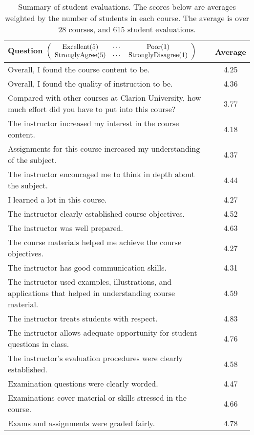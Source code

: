 \documentclass[12pt]{article}
\begin{document}
\begin{center}
\begin{table}[H]
\caption{Summary of student evaluations.  The scores below are averages weighted by the number of students in each course. The average is over 28 courses, and 615 student evaluations.}
\begin{tabular}{p{4.5in}c} \hline \hline
Question \scriptsize $\left( \begin{array}{ccc}  {\rm Excellent}(5) & \cdots & {\rm Poor}(1) \\ {\rm Strongly Agree}(5) & \cdots & {\rm Strongly Disagree}(1) \end{array} \right)$ & Average \\ \hline \hline
Overall, I found the course content to be. & 4.25 \\ \hline
Overall, I found the quality of instruction to be. & 4.36 \\ \hline
Compared with other courses at Clarion University, how much effort did you have to put into this course? & 3.77 \\ \hline
The instructor increased my interest in the course content. & 4.18 \\ \hline
Assignments for this course increased my understanding of the subject.  & 4.37 \\ \hline
The instructor encouraged me to think in depth about the subject. & 4.44 \\ \hline
I learned a lot in this course. & 4.27 \\ \hline
The instructor clearly established course objectives. & 4.52 \\ \hline
The instructor was well prepared. & 4.63 \\ \hline
The course materials helped me achieve the course objectives. & 4.27 \\ \hline
The instructor has good communication skills. & 4.31 \\ \hline
The instructor used examples, illustrations, and applications that helped in understanding course material. & 4.59 \\ \hline
The instructor treats students with respect. & 4.83 \\ \hline
The instructor allows adequate opportunity for student questions in class. & 4.76 \\ \hline
The instructor's evaluation procedures were clearly established.  & 4.58 \\ \hline
Examination questions were clearly worded. & 4.47 \\ \hline
Examinations cover material or skills stressed in the course. & 4.66 \\ \hline
Exams and assignments were graded fairly. & 4.78 \\ \hline
\end{tabular}
\end{table}
\end{center}
\end{document}
